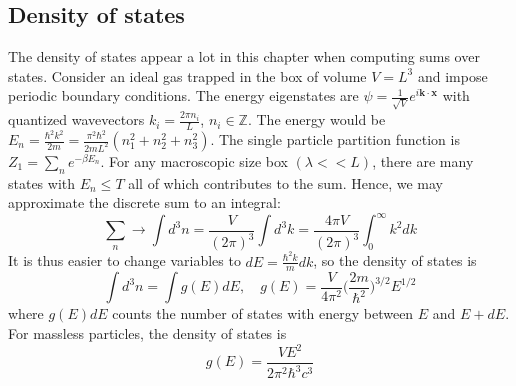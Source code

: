 \documentclass[a4paper]{article}
\theoremstyle{new}
\begin{document}
\subsection{Density of states}
The density of states appear a lot in this chapter when computing sums over states. Consider an ideal gas trapped in the box of volume $V=L^3$ and impose periodic boundary conditions. The energy eigenstates are $\psi=\frac{1}{\sqrt{V}}e^{i\mathbf{k}\cdot\mathbf{x}}$ with quantized wavevectors $k_i=\frac{2\pi n_i}{L}$, $n_i\in\mathbb{Z}$. The energy would be $E_n=\frac{\hbar^2k^2}{2m}=\frac{\pi^2\hbar^2}{2mL^2}(n_1^2+n_2^2+n_3^2)$. The single particle partition function is $Z_1=\sum_ne^{-\beta E_n}$. For any macroscopic size box $(\lambda<<L)$, there are many states with $E_n\leq T$ all of which contributes to the sum. Hence, we may approximate the discrete sum to an integral:
$$\sum_n\rightarrow\int d^3n=\frac{V}{(2\pi)^3}\int d^3k=\frac{4\pi V}{(2\pi)^3}\int_0^\infty k^2dk$$
It is thus easier to change variables to $dE=\frac{\hbar^2k}{m}dk$, so the density of states is
$$\int d^3n=\int g(E)dE,\quad g(E)=\frac{V}{4\pi^2}\bigg(\frac{2m}{\hbar^2}\bigg)^{3/2}E^{1/2}$$
where $g(E)dE$ counts the number of states with energy between $E$ and $E+dE$. For massless particles, the density of states is
$$g(E)=\frac{VE^2}{2\pi^2\hbar^3c^3}$$
\end{document}
